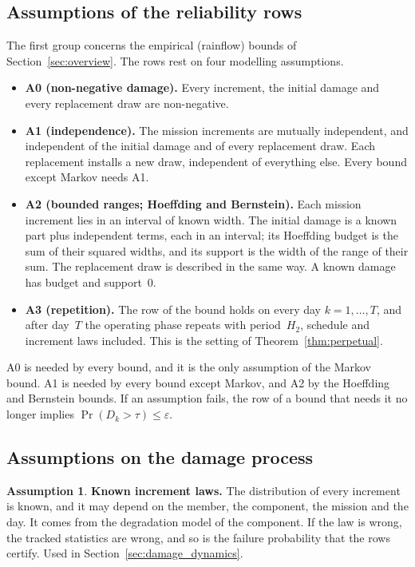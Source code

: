 \documentclass[11pt,a4paper]{article}
\theoremstyle{plain}
\theoremstyle{definition}
\newtheorem{assumption}{Assumption}
\theoremstyle{remark}
\begin{document}
\subsection{Assumptions of the reliability rows}

The first group concerns the empirical (rainflow) bounds of Section~\ref{sec:overview}.
The rows rest on four modelling assumptions.
\begin{itemize}
  \item \textbf{A0 (non-negative damage).} Every increment, the initial damage and every replacement draw are non-negative.
  \item \textbf{A1 (independence).} The mission increments are mutually independent, and independent of the initial damage and of every replacement draw.
    Each replacement installs a new draw, independent of everything else.
    Every bound except Markov needs A1.
  \item \textbf{A2 (bounded ranges; Hoeffding and Bernstein).} Each mission increment lies in an interval of known width.
    The initial damage is a known part plus independent terms, each in an interval; its Hoeffding budget is the sum of their squared widths, and its support is the width of the range of their sum.
    The replacement draw is described in the same way.
    A known damage has budget and support~$0$.
  \item \textbf{A3 (repetition).} The row of the bound holds on every day $k = 1, \ldots, T$, and after day~$T$ the operating phase repeats with period~$H_2$, schedule and increment laws included.
    This is the setting of Theorem~\ref{thm:perpetual}.
\end{itemize}
A0 is needed by every bound, and it is the only assumption of the Markov bound.
A1 is needed by every bound except Markov, and A2 by the Hoeffding and Bernstein bounds.
If an assumption fails, the row of a bound that needs it no longer implies $\Pr(D_k > \tau) \le \varepsilon$.

\subsection{Assumptions on the damage process}

\begin{assumption}\label{as:known_increments}
\textbf{Known increment laws.}
The distribution of every increment is known, and it may depend on the member, the component, the mission and the day.
It comes from the degradation model of the component.
If the law is wrong, the tracked statistics are wrong, and so is the failure probability that the rows certify.
Used in Section~\ref{sec:damage_dynamics}.
\end{assumption}
\end{document}
